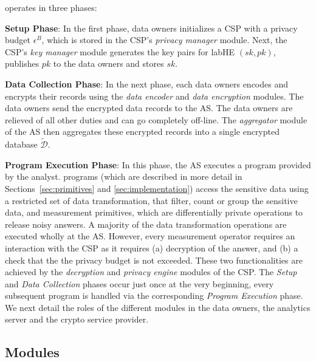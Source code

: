 \system operates in three phases: 
 \squishlist
 \item \textbf{Setup Phase}: In the first phase, data owners initializes a \textsf{CSP} with a privacy budget $\epsilon^B$, which is stored in the \textsf{CSP}'s \textit{privacy manager} module. Next, the  \textsf{CSP}'s \textit{key manager} module generates the key pairs for labHE $(sk,pk)$, publishes $pk$ to the data owners and stores $sk$. 
 \item \textbf{Data Collection Phase}: In the next phase, each data owners encodes and encrypts their records using the \textit{data encoder} and \textit{data encryption} modules. The data owners send the encrypted data records to the \textsf{AS}. The data owners are relieved of all other duties and can go completely off-line. The \textit{aggregator} module of the \textsf{AS} then aggregates these encrypted records into a single encrypted database $\boldsymbol{\tilde{\mathcal{D}}}$. 
 \item \textbf{Program Execution Phase}: In this phase, the \textsf{AS} executes a \system program provided by the analyst. \system programs (which are described in more detail in Sections~\ref{sec:primitives} and \ref{sec:implementation}) access the sensitive data using a restricted set of data transformation, that filter, count or group the sensitive data, and measurement primitives, which are differentially private operations to release noisy answers. A majority of the data transformation operations are executed wholly at the \textsf{AS}. However, every measurement operator requires an interaction with the \textsf{CSP} as it requires (a) decryption of the answer, and (b) a check that the the privacy budget is not exceeded. These two functionalities are achieved by the \textit{decryption} and \textit{privacy engine} modules of the \textsf{CSP}. 
 \squishend
 The \emph{Setup} and \emph{Data Collection} phases occur just once at the very beginning, every subsequent program  is handled via the corresponding  \emph{Program Execution} phase. We next detail the roles of the different modules in the data owners, the analytics server and the crypto service provider.  
 
\subsection{\system Modules}\label{sec:modules}

